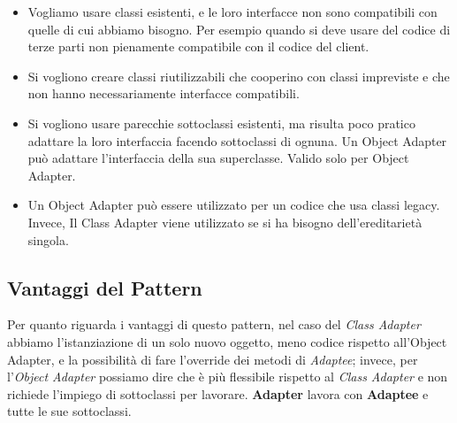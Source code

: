     \begin{itemize}
      
      \item Vogliamo usare classi esistenti, e le loro
      interfacce non sono compatibili con quelle di cui abbiamo bisogno.
      Per esempio quando si deve usare del codice di terze parti non 
      pienamente compatibile con il codice del client.
    
      \item Si vogliono creare classi riutilizzabili che cooperino con 
      classi impreviste e che non hanno necessariamente interfacce 
      compatibili.
      
      \item Si vogliono usare parecchie sottoclassi esistenti, ma risulta 
      poco pratico adattare la loro interfaccia facendo sottoclassi di ognuna. 
      Un Object Adapter può adattare l’interfaccia della sua superclasse. 
      Valido solo per Object Adapter.
      
      \item Un Object Adapter può essere utilizzato per un codice 
      che usa classi legacy. Invece, Il Class Adapter viene utilizzato se si ha bisogno 
      dell’ereditarietà singola.
    
    \end{itemize}
    
    \subsection{Vantaggi del Pattern}
    
    Per quanto riguarda i vantaggi di questo pattern, nel caso del 
    \emph{Class Adapter} abbiamo l'istanziazione di un solo nuovo oggetto,
    meno codice rispetto all'Object Adapter, e la 
    possibilità di fare l'override dei metodi di \emph{Adaptee}; invece,
    per l'\emph{Object Adapter} possiamo dire che è più flessibile rispetto
    al \emph{Class Adapter} e non richiede l'impiego di sottoclassi per lavorare.
    \textbf{Adapter} lavora con \textbf{Adaptee} e tutte le sue sottoclassi.